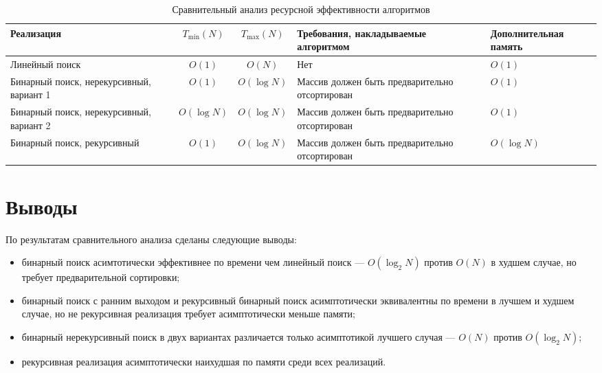 \documentclass{bmstu}
\begin{document}
\begin{table}[H]
	\centering
	\caption{Сравнительный анализ ресурсной эффективности алгоритмов}
	\label{tab:comparison}
	\begin{tabularx}{\textwidth}{|X|c|c|X|>{\centering\arraybackslash}X|}
		\hline
		Реализация                           & $T_{\min}(N)$                                  & $T_{\max}(N)$ &
		Требования, накладываемые алгоритмом & Дополнительная память                                                         \\ \hline
		Линейный поиск
		                                     & $O(1)$                                         & $O(N)$        & Нет & $O(1)$ \\ \hline
		Бинарный поиск, нерекурсивный, вариант 1
		                                     & $O(1)$                                         & $O(\log N)$
		                                     & Массив должен быть предварительно отсортирован & $O(1)$                       \\ \hline
		Бинарный поиск, нерекурсивный, вариант 2
		                                     & $O(\log N)$                                    & $O(\log N)$
		                                     & Массив должен быть предварительно отсортирован & $O(1)$                       \\ \hline
		Бинарный поиск, рекурсивный
		                                     & $O(1)$                                         & $O(\log N)$
		                                     & Массив должен быть предварительно отсортирован & $O(\log N)$                  \\ \hline
	\end{tabularx}
\end{table}

\section{Выводы}
По результатам сравнительного анализа сделаны следующие выводы:
\begin{itemize}
	\item бинарный поиск асимтотически эффективнее по времени чем линейный
	      поиск --- $O(\log_2N)$ против $O(N)$ в худшем случае, но требует
	      предварительной сортировки;
	\item бинарный поиск с ранним выходом и рекурсивный бинарный поиск
	      асимптотически эквивалентны по времени в лучшем и худшем случае, но не
	      рекурсивная реализация требует асимптотически меньше памяти;
	\item бинарный нерекурсивный поиск в двух вариантах различается только
	      асимптотикой лучшего случая --- $O(N)$ против $O(\log_2N)$;
	\item рекурсивная реализация асимптотически наихудшая по памяти среди
	      всех реализаций.
\end{itemize}
\end{document}

